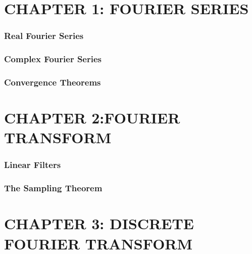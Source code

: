\documentclass[a4paper]{article}
\begin{document}
\fontsize{10.5}{6}
\selectfont
\begin{multicols}{2}
%
%
%
%
%

\section*{CHAPTER 1: FOURIER SERIES}
\subsubsection*{Real Fourier Series}


\subsubsection*{Complex Fourier Series}

\subsubsection*{Convergence Theorems}









\section*{CHAPTER 2:FOURIER TRANSFORM}




\subsubsection*{Linear Filters}





\subsubsection*{The Sampling Theorem}



\section*{CHAPTER 3: DISCRETE FOURIER TRANSFORM}





\end{multicols}
\end{document}
